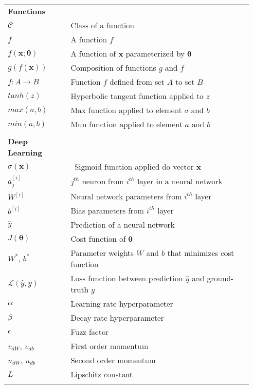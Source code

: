 \begin{longtable}{ll}
\\

{\bf Functions} \\
$\mathcal{C}$ & Class of a function \\
$f$ & A function $f$ \\
$f(\boldsymbol{x}; \boldsymbol{\theta})$ & A function of $\boldsymbol{x}$ parameterized by $\boldsymbol{\theta}$ \\
$g(f(\boldsymbol{x}))$ & Composition of functions $g$ and $f$ \\
$f : A \rightarrow B$ & Function $f$ defined from set $A$  to set $B$ \\
$tanh(z)$ & Hyperbolic tangent function applied to $z$ \\
$max(a,b)$ & Max function applied to element $a$ and $b$ \\
$min(a,b)$ & Mun function applied to element $a$ and $b$ \\

\\

{\bf Deep Learning} \\
$\sigma(\boldsymbol{x})$ &\ Sigmoid function applied do vector
 $\boldsymbol{x}$ \\
 $a^{[i]}_{j}$ & $j^{th}$ neuron from $i^{th}$ layer in a neural network \\
 $W^{[i]}$ & Neural network parameters from $i^{th}$ layer \\
 $b^{[i]}$ & Bias parameters from $i^{th}$ layer \\
 $\hat{y}$ & Prediction of a neural network \\
 $J(\boldsymbol{\theta})$ & Cost function of $\boldsymbol{\theta}$ \\
  $W^{*}$, $b^{*}$ & Parameter weights $W$ and $b$ that minimizes cost function \\
 $\mathcal{L}(\hat{y}, y)$ & Loss function between prediction $\hat{y}$ and ground-truth $y$ \\
 $\alpha$ & Learning rate hyperparameter \\
 $\beta$ & Decay rate hyperparameter \\
 $\epsilon$ & Fuzz factor \\
 $v_{dW}$, $v_{db}$ & First order momentum \\
 $u_{dW}$, $u_{db}$ & Second order momentum \\
 $L$ & Lipschitz constant \\
 
 \\
 

\end{longtable}
